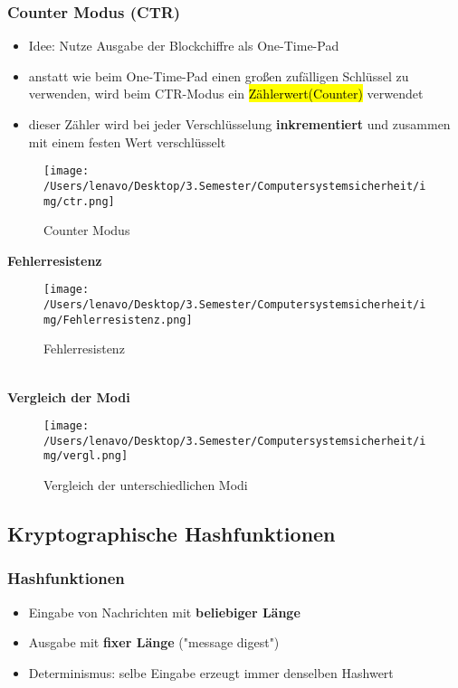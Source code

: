 \documentclass[a4paper, 10pt]{article}
\begin{document}
\subsubsection{Counter Modus (CTR)}
\begin{itemize}
    \item Idee: Nutze Ausgabe der Blockchiffre als One-Time-Pad
    \item anstatt wie beim One-Time-Pad einen großen zufälligen Schlüssel zu verwenden, wird beim CTR-Modus ein \hl{Zählerwert(Counter)} verwendet
    \item dieser Zähler wird bei jeder Verschlüsselung \textbf{inkrementiert} und zusammen mit einem festen Wert verschlüsselt
\end{itemize}
\begin{figure}[h]
    \centering
    \texttt{[image: /Users/lenavo/Desktop/3.Semester/Computersystemsicherheit/img/ctr.png]}
    \caption{Counter Modus}
    \label{fig:enter-label}
\end{figure}
\textbf{Fehlerresistenz}
\begin{figure}[h]
    \centering
    \texttt{[image: /Users/lenavo/Desktop/3.Semester/Computersystemsicherheit/img/Fehlerresistenz.png]}
    \caption{Fehlerresistenz}
    \label{fig:enter-label}
\end{figure}\\[2mm]
\textbf{Vergleich der Modi}
\begin{figure}[h]
    \centering
    \texttt{[image: /Users/lenavo/Desktop/3.Semester/Computersystemsicherheit/img/vergl.png]}
    \caption{Vergleich der unterschiedlichen Modi}
    \label{fig:enter-label}
\end{figure}
\subsection{Kryptographische Hashfunktionen}
\subsubsection{Hashfunktionen}
\begin{itemize}
    \item Eingabe von Nachrichten mit \textbf{beliebiger Länge}
    \item Ausgabe mit \textbf{fixer Länge} ("message digest")
    \item Determinismus: selbe Eingabe erzeugt immer denselben Hashwert
\end{itemize}
\end{document}
